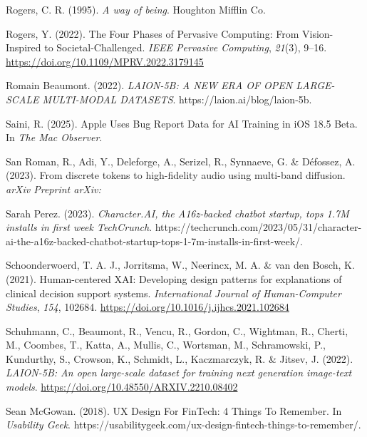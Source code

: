 \documentclass[
  letterpaper,
  DIV=11,
  numbers=noendperiod]{scrartcl}
\newlength{\cslhangindent}
\newenvironment{CSLReferences}[2] %
 {\begin{list}{}{%
  \setlength{\itemindent}{0pt}
  \setlength{\leftmargin}{0pt}
  \setlength{\parsep}{0pt}
  \ifodd #1
   \setlength{\leftmargin}{\cslhangindent}
   \setlength{\itemindent}{-1\cslhangindent}
  \fi
  \setlength{\itemsep}{#2\baselineskip}}}
 {\end{list}}
\begin{document}
\begin{CSLReferences}{1}{0}
Rogers, C. R. (1995). \emph{A way of being}. Houghton Mifflin Co.

Rogers, Y. (2022). The {Four Phases} of {Pervasive Computing}: {From
Vision-Inspired} to {Societal-Challenged}. \emph{IEEE Pervasive
Computing}, \emph{21}(3), 9--16.
\url{https://doi.org/10.1109/MPRV.2022.3179145}

Romain Beaumont. (2022). \emph{{LAION-5B}: {A NEW ERA OF OPEN
LARGE-SCALE MULTI-MODAL DATASETS}}. https://laion.ai/blog/laion-5b.

Saini, R. (2025). Apple {Uses Bug Report Data} for {AI Training} in
{iOS} 18.5 {Beta}. In \emph{The Mac Observer}.

San Roman, R., Adi, Y., Deleforge, A., Serizel, R., Synnaeve, G. \&
Défossez, A. (2023). From discrete tokens to high-fidelity audio using
multi-band diffusion. \emph{arXiv Preprint arXiv:}

Sarah Perez. (2023). \emph{Character.{AI}, the A16z-backed chatbot
startup, tops 1.{7M} installs in first week {\textbar} {TechCrunch}}.
https://techcrunch.com/2023/05/31/character-ai-the-a16z-backed-chatbot-startup-tops-1-7m-installs-in-first-week/.

Schoonderwoerd, T. A. J., Jorritsma, W., Neerincx, M. A. \& van den
Bosch, K. (2021). Human-centered {XAI}: {Developing} design patterns for
explanations of clinical decision support systems. \emph{International
Journal of Human-Computer Studies}, \emph{154}, 102684.
\url{https://doi.org/10.1016/j.ijhcs.2021.102684}

Schuhmann, C., Beaumont, R., Vencu, R., Gordon, C., Wightman, R.,
Cherti, M., Coombes, T., Katta, A., Mullis, C., Wortsman, M.,
Schramowski, P., Kundurthy, S., Crowson, K., Schmidt, L., Kaczmarczyk,
R. \& Jitsev, J. (2022). \emph{{LAION-5B}: {An} open large-scale dataset
for training next generation image-text models}.
\url{https://doi.org/10.48550/ARXIV.2210.08402}

Sean McGowan. (2018). {UX Design For FinTech}: 4 {Things To Remember}.
In \emph{Usability Geek}.
https://usabilitygeek.com/ux-design-fintech-things-to-remember/.


\end{CSLReferences}
\end{document}
